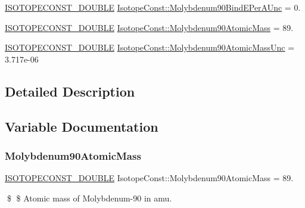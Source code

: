 \begin{DoxyCompactItemize}
\mbox{\hyperlink{group___isotope_const-_macros_ga8f45a7272ce02c0b4c65c44636ed719a}{I\+S\+O\+T\+O\+P\+E\+C\+O\+N\+S\+T\+\_\+\+D\+O\+U\+B\+LE}} \mbox{\hyperlink{group___isotope_const-_molybdenum-_mo90_gae9d32ae1b16e30d6d036b582db8765cd}{Isotope\+Const\+::\+Molybdenum90\+Bind\+E\+Per\+A\+Unc}} = 0.
\item 
\mbox{\hyperlink{group___isotope_const-_macros_ga8f45a7272ce02c0b4c65c44636ed719a}{I\+S\+O\+T\+O\+P\+E\+C\+O\+N\+S\+T\+\_\+\+D\+O\+U\+B\+LE}} \mbox{\hyperlink{group___isotope_const-_molybdenum-_mo90_ga4e61109fa7944c65fcb470efc3e58ae3}{Isotope\+Const\+::\+Molybdenum90\+Atomic\+Mass}} = 89.
\item 
\mbox{\hyperlink{group___isotope_const-_macros_ga8f45a7272ce02c0b4c65c44636ed719a}{I\+S\+O\+T\+O\+P\+E\+C\+O\+N\+S\+T\+\_\+\+D\+O\+U\+B\+LE}} \mbox{\hyperlink{group___isotope_const-_molybdenum-_mo90_ga0fd2b3101d885acb20722d644e1d0690}{Isotope\+Const\+::\+Molybdenum90\+Atomic\+Mass\+Unc}} = 3.\+717e-\/06
\end{DoxyCompactItemize}


\subsection{Detailed Description}


\subsection{Variable Documentation}
\mbox{\label{group___isotope_const-_molybdenum-_mo90_ga4e61109fa7944c65fcb470efc3e58ae3}} 
\subsubsection{\texorpdfstring{Molybdenum90\+Atomic\+Mass}{Molybdenum90AtomicMass}}
{\footnotesize\ttfamily \mbox{\hyperlink{group___isotope_const-_macros_ga8f45a7272ce02c0b4c65c44636ed719a}{I\+S\+O\+T\+O\+P\+E\+C\+O\+N\+S\+T\+\_\+\+D\+O\+U\+B\+LE}} Isotope\+Const\+::\+Molybdenum90\+Atomic\+Mass = 89.}

\$ \$ Atomic mass of Molybdenum-\/90 in amu. \mbox{\label{group___isotope_const-_molybdenum-_mo90_ga0fd2b3101d885acb20722d644e1d0690}} 
